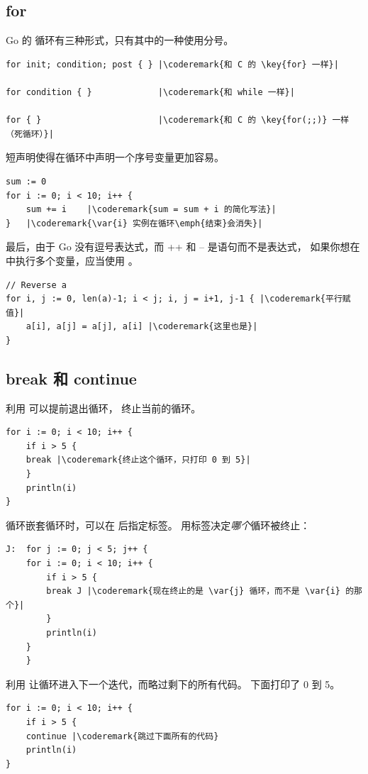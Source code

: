 \subsection{for}
\label{sec:for}
Go 的  循环有三种形式，只有其中的一种使用分号。
\begin{lstlisting}
for init; condition; post { } |\coderemark{和 C 的 \key{for} 一样}|

for condition { }             |\coderemark{和 while 一样}|

for { }                       |\coderemark{和 C 的 \key{for(;;)} 一样（死循环）}|
\end{lstlisting}
短声明使得在循环中声明一个序号变量更加容易。
\begin{lstlisting}
sum := 0
for i := 0; i < 10; i++ {
    sum += i	|\coderemark{sum = sum + i 的简化写法}|
}   |\coderemark{\var{i} 实例在循环\emph{结束}会消失}|
\end{lstlisting}
最后，由于 Go 没有逗号表达式，而 ++ 和 -- 是语句而不是表达式，
如果你想在  中执行多个变量，应当使用 。
\begin{lstlisting}
// Reverse a
for i, j := 0, len(a)-1; i < j; i, j = i+1, j-1 { |\coderemark{平行赋值}|
    a[i], a[j] = a[j], a[i] |\coderemark{这里也是}|
}
\end{lstlisting}

\subsection{break 和 continue}
利用  可以提前退出循环， 终止当前的循环。
\begin{lstlisting}
for i := 0; i < 10; i++ {
    if i > 5 {
	break |\coderemark{终止这个循环，只打印 0 到 5}|
    }
    println(i)
}
\end{lstlisting}
循环嵌套循环时，可以在  后指定标签。
用标签决定\emph{哪个}循环被终止：
\begin{lstlisting}
J:  for j := 0; j < 5; j++ {
	for i := 0; i < 10; i++ {
	    if i > 5 { 
		break J	|\coderemark{现在终止的是 \var{j} 循环，而不是 \var{i} 的那个}|
	    }
	    println(i)
	}
    } 
\end{lstlisting}

利用  让循环进入下一个迭代，而略过剩下的所有代码。
下面打印了 0 到 5。
\begin{lstlisting}
for i := 0; i < 10; i++ {
    if i > 5 {
	continue |\coderemark{跳过下面所有的代码}
    println(i)
}
\end{lstlisting}

